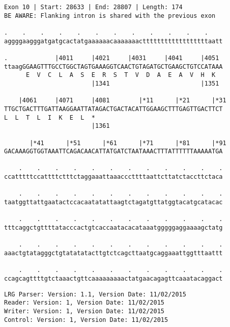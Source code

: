 \documentclass{article}
\begin{document}
\begin{Verbatim}[fontfamily=courier]
Exon 10 | Start: 28633 | End: 28807 | Length: 174
BE AWARE: Flanking intron is shared with the previous exon

.    .    .    .    .    .    .    .    .    .    .    .    
aggggaagggatgatgcactatgaaaaaacaaaaaaacttttttttttttttttttaatt

.             |4011     |4021     |4031     |4041     |4051 
ttaagGGAAGTTTGCCTGGCTAGTGAAAGGTCAACTGTAGATGCTGAAGCTGTCCATAAA
      E  V  C  L  A  S  E  R  S  T  V  D  A  E  A  V  H  K  
                        |1341                         |1351 

    |4061     |4071     |4081        |*11      |*21      |*31
TTGCTGACTTTGATTAAGGAATTATAGACTGACTACATTGGAAGCTTTGAGTTGACTTCT
L  L  T  L  I  K  E  L  *   
                        |1361                               

       |*41      |*51      |*61      |*71      |*81      |*91
GACAAAGGTGGTAAATTCAGACAACATTATGATCTAATAAACTTTATTTTTTAAAAATGA

    .    .    .    .    .    .    .    .    .    .    .    .
ccatttttccattttctttctaggaaattaaacccttttaattcttatctaccttctaca

    .    .    .    .    .    .    .    .    .    .    .    .
taatggttattgaatactccacaatatattaagtctagatgttatggtacatgcatacac

    .    .    .    .    .    .    .    .    .    .    .    .
tttcaggctgttttatacccactgtcaccaatacacataaatgggggaggaaaagctatg

    .    .    .    .    .    .    .    .    .    .    .    .
aaactgtatagggctgtatatatacttgtctcagcttaatgcaggaaattggtttaattt

    .    .    .    .    .    .    .    .    .    .    .    .
ccagcagttttgtctaaactgttcaaaaaaaaactatgaacagagttcaaatacaggact
\end{Verbatim}
\newpage
\begin{Verbatim}[fontfamily=courier]
LRG Parser: Version: 1.1, Version Date: 11/02/2015
Reader: Version: 1, Version Date: 11/02/2015
Writer: Version: 1, Version Date: 11/02/2015
Control: Version: 1, Version Date: 11/02/2015
\end{Verbatim}
\end{document}
